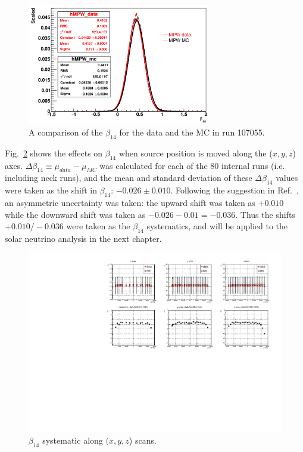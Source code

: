 \begin{figure}[htbp]
	\centering
	\includegraphics[width=8cm]{N16FitMPW_beta14_107055.png}
	\caption{A comparison of the $\beta_{14}$ for the data and the MC in run 107055. \label{fig:N16beta14MPW}}
\end{figure}

Fig.~\ref{beta14_XYZscans} shows the effects on $\beta_{14}$ when source position is moved along the ($x, y, z$) axes. $\Delta \beta_{14}\equiv\mu_{data}-\mu_{MC}$ was calculated for each of the 80 internal runs (i.e. including neck runs), and the mean and standard deviation of these $\Delta \beta_{14}$ values were taken as the shift in $\beta_{14}$: $-0.026\pm0.010$. Following the suggestion in Ref.~\cite{waterunidoc}, an asymmetric uncertainty was taken: the upward shift was taken as $+0.010$ while the downward shift was taken as $-0.026-0.01=-0.036$. Thus the shifts $+0.010/-0.036$ were taken as the $\beta_{14}$ systematics, and will be applied to the solar neutrino analysis in the next chapter. 

\begin{figure}[htbp]
	\centering
	\includegraphics[width=16cm]{beta14_xyzScans.pdf}
	\caption{$\beta_{14}$ systematic along $(x, y, z$) scans.	\label{beta14_XYZscans}}
\end{figure}

